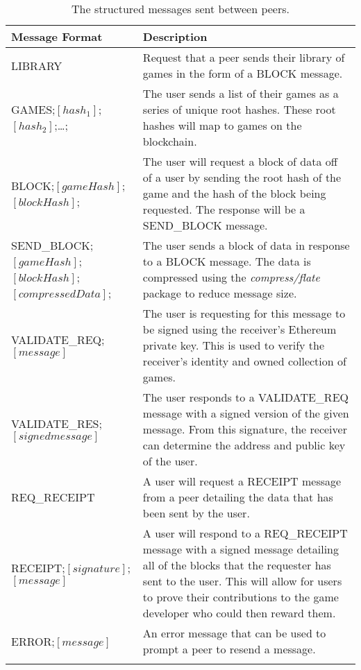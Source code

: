 \begin{longtable}{p{} p{}}
  \toprule
  \textbf{Message Format} & \textbf{Description}\\
  \midrule\midrule
  LIBRARY
  & Request that a peer sends their library of games in the form of a BLOCK message.\\
  GAMES;$[hash_1]$;$[hash_2]$;\ldots;
  & The user sends a list of their games as a series of unique root hashes. These root hashes will map to games on the blockchain.\\
  \midrule
  BLOCK;$[gameHash]$;$[blockHash]$;
  & The user will request a block of data off of a user by sending the root hash of the game and the hash of the block being requested. The response will be a SEND\_BLOCK message.\\
  SEND\_BLOCK;$[gameHash]$;\newline $[blockHash]$;$[compressedData]$;
  & The user sends a block of data in response to a BLOCK message. The data is compressed using the \textit{compress/flate} package to reduce message size.\\
  \midrule
  VALIDATE\_REQ;$[message]$
  & The user is requesting for this message to be signed using the receiver's Ethereum private key. This is used to verify the receiver's identity and owned collection of games.\\
  VALIDATE\_RES;$[signed message]$
  & The user responds to a VALIDATE\_REQ message with a signed version of the given message. From this signature, the receiver can determine the address and public key of the user.\\
  \midrule
  REQ\_RECEIPT
  & A user will request a RECEIPT message from a peer detailing the data that has been sent by the user.\\
  RECEIPT;$[signature]$;$[message]$
  & A user will respond to a REQ\_RECEIPT message with a signed message detailing all of the blocks that the requester has sent to the user. This will allow for users to prove their contributions to the game developer who could then reward them.\\
  \midrule
  ERROR;$[message]$
  & An error message that can be used to prompt a peer to resend a message.\\
  \bottomrule\bottomrule
  \caption{The structured messages sent between peers.}
\end{longtable}
